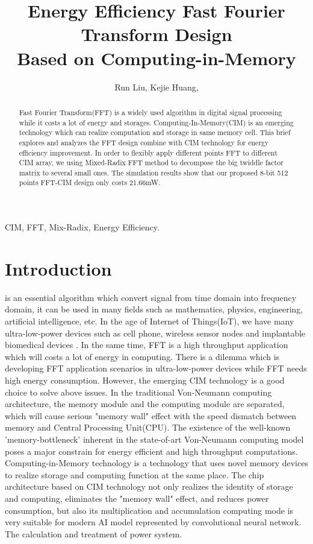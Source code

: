 \documentclass[journal]{IEEEtran}
\begin{document}
\title{Energy Efficiency Fast Fourier Transform Design \\ Based on Computing-in-Memory}
\author{Run Liu, 
        Kejie Huang, }

\maketitle
\begin{abstract}
Fast Fourier Transform(FFT) is a widely used algorithm in digital signal processing while it costs a lot of energy and storages. Computing-In-Memory(CIM) is an emerging technology which can realize computation and storage in same memory cell. This brief explores and analyzes the FFT design combine with CIM technology for energy efficiency improvement. In order to flexibly apply different points FFT to different CIM array, we using Mixed-Radix FFT method to decompose the big twiddle factor matrix to several small ones. The simulation results show that our proposed 8-bit 512 points FFT-CIM design only costs 21.66mW.
\end{abstract}

\begin{IEEEkeywords}
CIM, FFT, Mix-Radix, Energy Efficiency.
\end{IEEEkeywords}


\section{Introduction}
 is an essential algorithm which convert signal from time domain into frequency domain, it can be used in many fields such as mathematics, physics, engineering, artificial intelligence, etc. In the age of Internet of Things(IoT), we have many ultra-low-power devices such as cell phone, wireless sensor nodes and implantable biomedical devices \cite{1}. In the same time, FFT is a high throughput application which will costs a lot of energy in computing. There is a dilemma which is developing FFT application scenarios in ultra-low-power devices while FFT needs high energy consumption. However, the emerging CIM technology is a good choice to solve above issues. In the traditional Von-Neumann computing architecture, the memory module and the computing module are separated, which will cause serious\cite{2} "memory wall" effect with the speed dismatch between memory and Central Processing Unit(CPU). The existence of the well-known 'memory-bottleneck' inherent in the state-of-art Von-Neumann computing model poses a major constrain for energy efficient and high throughput computations. Computing-in-Memory technology is a technology that uses novel memory devices to realize storage and computing function at the same place. The chip architecture based on CIM technology not only realizes the identity of storage and computing, eliminates the "memory wall" effect, and reduces power consumption, but also its multiplication and accumulation computing mode is very suitable for modern AI model represented by convolutional neural network. The calculation and treatment of power system.
\end{document}

